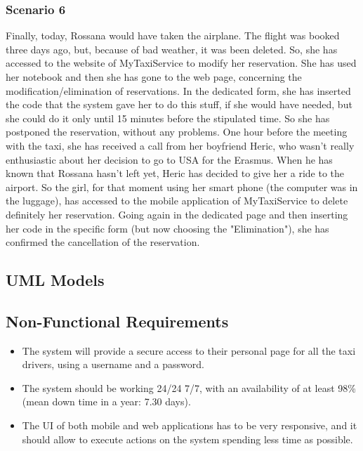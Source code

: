 		\subsubsection{Scenario 6}
		Finally, today, Rossana would have taken the airplane. The flight was booked three days ago, but, because of bad weather, it was been deleted. So, she has accessed to the website of MyTaxiService to modify her reservation. She has used her notebook and then she has gone to the web page, concerning the modification/elimination of reservations. In the dedicated form, she has inserted the code that the system gave her to do this stuff, if she would have needed, but she could do it only until 15 minutes before the stipulated time. So she has postponed the reservation, without any problems.
		One hour before the meeting with the taxi, she has received a call from her boyfriend Heric, who wasn't really enthusiastic about her decision to go to USA for the Erasmus. When he has known that Rossana hasn't left yet, Heric has decided to give her a ride to the airport. So the girl, for that moment using her smart phone (the computer was in the luggage), has accessed to the mobile application of MyTaxiService to delete definitely her reservation. Going again in the dedicated page and then inserting her code in the specific form (but now choosing the "Elimination"), she has confirmed the cancellation of the reservation. 
	\newpage
	\subsection{UML Models}
		
		
		\newpage
		
		
	\subsection{Non-Functional Requirements}
		\begin{itemize}
		\item The system will provide a secure access to their personal page for all the taxi drivers, using a username and a password.
		\item The system should be working 24/24 7/7, with an availability of at least 98\% (mean down time in a year: 7.30 days).
		\item The UI of both mobile and web applications has to be very responsive, and it should allow to execute actions on the system spending less time as possible.
		\end{itemize}
